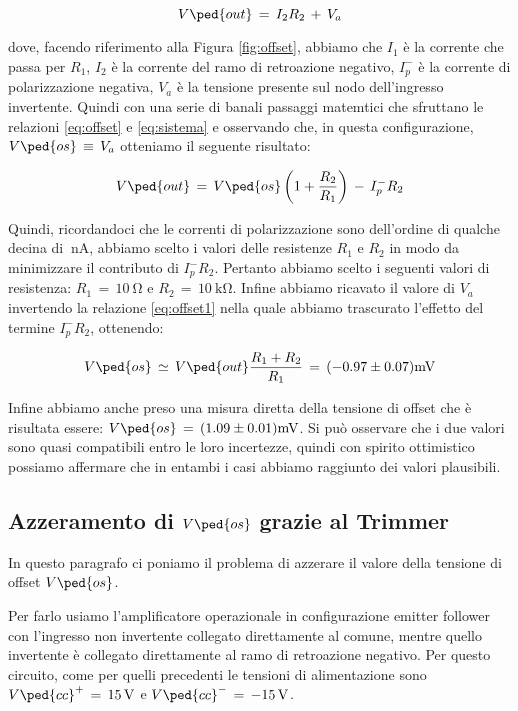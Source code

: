 \begin{equation}
	V\ped{out}\,=\,I_2R_2\,+\,V_a
	\label{eq:offset}
\end{equation}

dove, facendo riferimento alla Figura \ref{fig:offset}, abbiamo che $I_1$ è la corrente che passa per $R_1$, $I_2$ è la corrente del ramo di retroazione negativo, $I_{p}^-$ è la corrente di polarizzazione negativa, $V_a$ è la tensione presente sul nodo dell'ingresso invertente.
Quindi con una serie di banali passaggi matemtici che sfruttano le relazioni \ref{eq:offset} e \ref{eq:sistema} e osservando che, in questa configurazione, $V\ped{os}\,\equiv\,V_a$ otteniamo il seguente risultato:

\begin{equation}
	V\ped{out}\,=\,V\ped{os}\left(1+\frac{R_2}{R_1}\right)\,-\,I_{p}^-R_2
	\label{eq:offset1}
\end{equation}

Quindi, ricordandoci che le correnti di polarizzazione sono dell'ordine di qualche decina di $\SI{}{\nano\ampere}$, abbiamo scelto i valori delle resistenze $R_1$ e $R_2$ in modo da minimizzare il contributo di $I_{p}^-R_2$. Pertanto abbiamo scelto i seguenti valori di resistenza: $R_1\,=\,\SI{10}{\ohm}$ e $R_2\,=\,\SI{10}{\kilo\ohm}$.
Infine abbiamo ricavato il valore di $V_a$ invertendo la relazione \ref{eq:offset1} nella quale abbiamo trascurato l'effetto del termine $I_{p}^-R_2$, ottenendo:

\begin{equation}
	V\ped{os}\,\simeq\,V\ped{out}\frac{R_1+R_2}{R_1}\,=\, (-0.97 \pm 0.07)\SI{}{\milli\volt}
\end{equation}

Infine abbiamo anche preso una misura diretta della tensione di offset che è risultata essere: $V\ped{os}\,=\,(1.09\pm0.01)\SI{}{\milli\volt}$. Si può osservare che i due valori sono quasi compatibili entro le loro incertezze, quindi con spirito ottimistico possiamo affermare che in entambi i casi abbiamo raggiunto dei valori plausibili.

\subsection*{Azzeramento di $V\ped{os}$ grazie al Trimmer}

In questo paragrafo ci poniamo il problema di azzerare il valore della tensione di offset $V\ped{os}$.

Per farlo usiamo l'amplificatore operazionale in configurazione emitter follower con l'ingresso non invertente collegato direttamente al comune, mentre quello invertente è collegato direttamente al ramo di retroazione negativo. Per questo circuito, come per quelli precedenti le tensioni di alimentazione sono $V\ped{cc}^+\,=\,\SI{+15}{\volt}$ e $V\ped{cc}^-\,=\,\SI{-15}{\volt}$.

